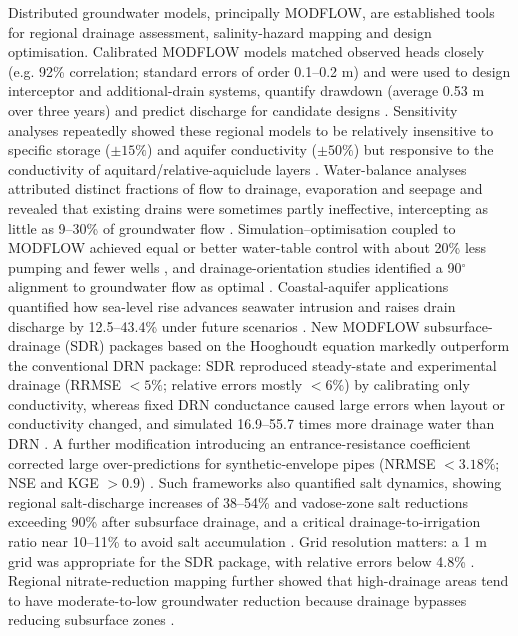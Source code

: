 \documentclass[11pt]{article}
\begin{document}
Distributed groundwater models, principally MODFLOW, are established tools for regional drainage assessment, salinity-hazard mapping and design optimisation. Calibrated MODFLOW models matched observed heads closely (e.g. 92\% correlation; standard errors of order 0.1--0.2 m) and were used to design interceptor and additional-drain systems, quantify drawdown (average 0.53 m over three years) and predict discharge for candidate designs \parencite{Ghorbani2016,Mirlas2012,Mirlas2009,Mirlas2013,Mirlas2021,AbdElaziz2025}. Sensitivity analyses repeatedly showed these regional models to be relatively insensitive to specific storage ($\pm15\%$) and aquifer conductivity ($\pm50\%$) but responsive to the conductivity of aquitard/relative-aquiclude layers \parencite{Mirlas2012,Mirlas2009,Mirlas2013}. Water-balance analyses attributed distinct fractions of flow to drainage, evaporation and seepage and revealed that existing drains were sometimes partly ineffective, intercepting as little as 9--30\% of groundwater flow \parencite{Mirlas2009,Mirlas2012}. Simulation--optimisation coupled to MODFLOW achieved equal or better water-table control with about 20\% less pumping and fewer wells \parencite{Rana2008}, and drainage-orientation studies identified a 90$^{\circ}$ alignment to groundwater flow as optimal \parencite{AbdElaziz2025}. Coastal-aquifer applications quantified how sea-level rise advances seawater intrusion and raises drain discharge by 12.5--43.4\% under future scenarios \parencite{AbdElaty2019}. New MODFLOW subsurface-drainage (SDR) packages based on the Hooghoudt equation markedly outperform the conventional DRN package: SDR reproduced steady-state and experimental drainage (RRMSE $<5\%$; relative errors mostly $<6\%$) by calibrating only conductivity, whereas fixed DRN conductance caused large errors when layout or conductivity changed, and simulated 16.9--55.7 times more drainage water than DRN \parencite{Yang2022b,Han2025}. A further modification introducing an entrance-resistance coefficient corrected large over-predictions for synthetic-envelope pipes (NRMSE $<3.18\%$; NSE and KGE $>0.9$) \parencite{Qian2025b}. Such frameworks also quantified salt dynamics, showing regional salt-discharge increases of 38--54\% and vadose-zone salt reductions exceeding 90\% after subsurface drainage, and a critical drainage-to-irrigation ratio near 10--11\% to avoid salt accumulation \parencite{Yang2022b,Han2025}. Grid resolution matters: a 1 m grid was appropriate for the SDR package, with relative errors below 4.8\% \parencite{Han2025}. Regional nitrate-reduction mapping further showed that high-drainage areas tend to have moderate-to-low groundwater reduction because drainage bypasses reducing subsurface zones \parencite{Hojberg2017,Hansen2019}.
\end{document}
